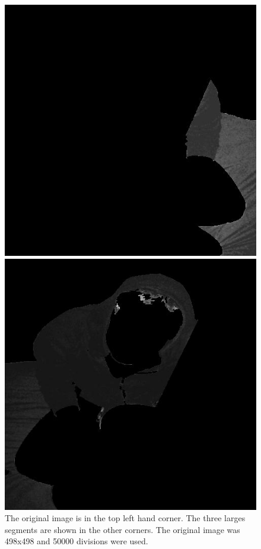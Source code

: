 \begin{figure}[ht]
\begin{minipage}[b]{0.47\linewidth}
\end{minipage}
\begin{minipage}[b]{0.47\linewidth}
\centering
\includegraphics[width=\textwidth]{MSTseg3.jpg}
\end{minipage}
\hspace{0.5cm}
\begin{minipage}[b]{0.47\linewidth}
\centering
\includegraphics[width=\textwidth]{MSTseg4.jpg}
\end{minipage}
\caption{The original image is in the top left hand corner. The three larges segments are shown in the other corners. The original image was 498x498 and 50000 divisions were used.}
\end{figure}
\vfill 
